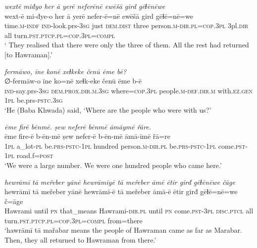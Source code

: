 \ea \label{BP.108}
\textit{wextē miđyo her ā yerē neferēnē ewēšā gird gēɫēnēwe} \\ 
\gll wext-ē mi-đye-o her ā yerē nefer-ē=nē ewēšā gird gēɫē=nē=we \\ 
 time\textsc{.m}\textsc{-indf} \textsc{ind-}look.prs\textsc{-3sg} just \textsc{dem.dist} three person\textsc{.m}\textsc{-dir}\textsc{.pl}\textsc{=cop}\textsc{.3pl} 3pl\textsc{.dir} all turn\textsc{.pst}\textsc{.ptcp}\textsc{.pl}\textsc{=cop}\textsc{.3pl}\textsc{=compl} \\ 
\glt ` They realised that there were only the three of them. All the rest had returned [to Hawraman].'
\z 
 
\ea \label{BP.109}
\textit{fermāwo, īne konē xeɫkeke čenū ēme bē?} \\ 
\gll ∅-fermāw-o īne ko=nē xeɫk-eke čenū ēme b-ē \\ 
 \textsc{ind-}say.prs\textsc{-3sg} \textsc{dem.prox}\textsc{.dir}\textsc{.m}\textsc{.3sg} where\textsc{=cop}\textsc{.3pl} people\textsc{.m}\textsc{-def}\textsc{.dir}\textsc{.m} with\textsc{.ez.gen} \textsc{1pl} be.prs\textsc{-pstc}\textsc{.3sg} \\ 
\glt `He (Baba Khwada) said, ‘Where are the people who were with us?'
\z 
 
\ea \label{BP.110}
\textit{ēme firē bēnmē. ṣew neferē bēnmē āmāymē řāre.} \\ 
\gll ēme fire-ē b-ēn-mē ṣew nefer-ē b-ēn-mē āmā-īmē řā=re \\ 
 \textsc{1pl} a\_lot\textsc{-pl} be.\textsc{prs}\textsc{-pstc}\textsc{-\textsc{1pl}} hundred person\textsc{.m}\textsc{-dir.pl} be.\textsc{prs}\textsc{-pstc}\textsc{-\textsc{1pl}} come\textsc{.pst}-\textsc{1pl} road.f\textsc{=\textsc{post}} \\ 
\glt `We were a large number. We were one hundred  people who came here.'
\z 
 
\ea \label{BP.115}
\textit{hewrāmī tā meřeber yānē hewrāmīyē tā meřeber āmē ētir girđ gēɫēnēwe čāge} \\ 
\gll hewrāmī tā meřeber yānē hewrāmī-ē tā meřeber āmā-ē ētir girđ gēɫē=nē=we č=āge \\ 
 Hawrami until \textsc{pn} that\_means Hawrami\textsc{-dir}\textsc{.pl} until \textsc{pn} come\textsc{.pst}\textsc{-3pl} \textsc{disc.ptcl} all turn\textsc{.pst}\textsc{.ptcp}\textsc{.pl}\textsc{=cop}\textsc{.3pl}\textsc{=compl} from=there \\ 
\glt `hawrāmī tā mařabar means the people of Hawraman came as far as Marabar. Then, they all returned to Hawraman from there.'
\z 
 
